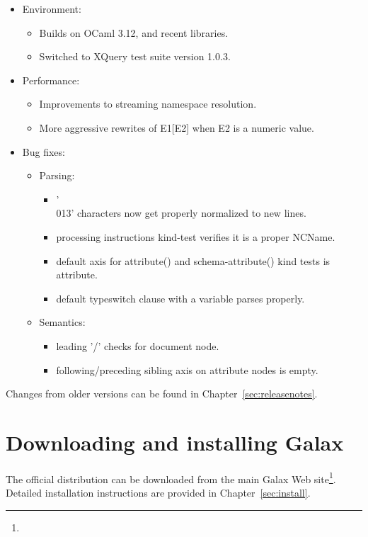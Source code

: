 \begin{itemize}
\item Environment:
\begin{itemize}
\item Builds on OCaml 3.12, and recent libraries.
\item Switched to XQuery test suite version 1.0.3.
\end{itemize}
\item Performance:
\begin{itemize}
\item Improvements to streaming namespace resolution.
\item More aggressive rewrites of E1[E2] when E2 is a numeric value.
\end{itemize}
\item Bug fixes:
\begin{itemize}
\item Parsing:
\begin{itemize}
\item '\\013' characters now get properly normalized to new lines.
\item processing instructions kind-test verifies it is a proper NCName.
\item default axis for attribute() and schema-attribute() kind tests
  is attribute.
\item default typeswitch clause with a variable parses properly.
\end{itemize}
\item Semantics:
\begin{itemize}
\item leading '/' checks for document node.
\item following/preceding sibling axis on attribute nodes is empty.
\end{itemize}
\end{itemize}
\end{itemize}

Changes from older versions can be found in
Chapter~\ref{sec:releasenotes}.

\section{Downloading and installing Galax}

The official distribution can be downloaded from the main Galax Web
site\footnote{\galaxurl}.  Detailed installation instructions are
provided in Chapter~\ref{sec:install}.


